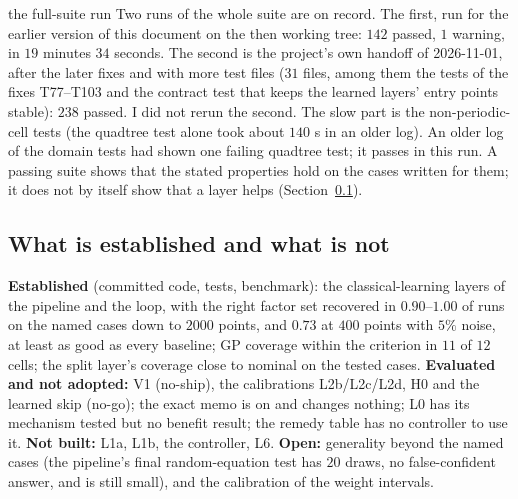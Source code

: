 \begin{explained}{the full-suite run}
Two runs of the whole suite are on record. The first, run for the earlier version of this document on the then working tree: $142$ passed, $1$ warning, in $19$ minutes $34$ seconds. The second is the project's own handoff of 2026-11-01, after the later fixes and with more test files ($31$ files, among them the tests of the fixes T77--T103 and the contract test that keeps the learned layers' entry points stable): $238$ passed. I did not rerun the second. The slow part is the non-periodic-cell tests (the quadtree test alone took about $140$ s in an older log). An older log of the domain tests had shown one failing quadtree test; it passes in this run. A passing suite shows that the stated properties hold on the cases written for them; it does not by itself show that a layer helps (Section~\ref{sec:status}).
\end{explained}

\subsection{What is established and what is not}\label{sec:status}
\begin{keypoint}
\textbf{Established} (committed code, tests, benchmark): the classical-learning layers of the pipeline and the loop, with the right factor set recovered in $0.90$--$1.00$ of runs on the named cases down to $2000$ points, and $0.73$ at $400$ points with $5\%$ noise, at least as good as every baseline; GP coverage within the criterion in $11$ of $12$ cells; the split layer's coverage close to nominal on the tested cases. \textbf{Evaluated and not adopted:} V1 (no-ship), the calibrations L2b/L2c/L2d, H0 and the learned skip (no-go); the exact memo is on and changes nothing; L0 has its mechanism tested but no benefit result; the remedy table has no controller to use it. \textbf{Not built:} L1a, L1b, the controller, L6. \textbf{Open:} generality beyond the named cases (the pipeline's final random-equation test has $20$ draws, no false-confident answer, and is still small), and the calibration of the weight intervals.
\end{keypoint}



